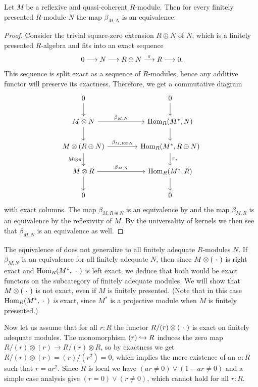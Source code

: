 \begin{corollary}
  \label{identification-hom-tensor-for-fp-modules}
  Let $M$ be a reflexive and quasi-coherent $R$-module.
  Then for every finitely presented $R$-module $N$ the map $\beta_{M,N}$
  is an equivalence.
\end{corollary}

\begin{proof}
  Consider the trivial square-zero extension $R \oplus N$ of $N$, which is a finitely presented $R$-algebra and fits into an exact sequence
  \[
    0 \longrightarrow N \longrightarrow R \oplus N \overset{\pi}{\longrightarrow} R \longrightarrow 0\rlap{.}
  \]
  This sequence is split exact as a sequence of $R$-modules, hence any additive functor will preserve its exactness.
  Therefore, we get a commutative diagram
  \[
  \begin{tikzcd}[column sep=1.5cm]
    0 \ar[d] & 0 \ar[d] \\
    M \otimes N \ar[d]\ar[r, "\beta_{M,N}"] & \Hom_R(M^\ast,N) \ar[d] \\
    M\otimes (R\oplus N) \ar[r,"\beta_{M,R \oplus N}"] \ar[d,"M \otimes \pi"'] & \operatorname{Hom}_R(M^\ast,R\oplus N) \ar[d,"\pi_\ast"] \\
    M \otimes R \ar[d]\ar[r,"\beta_{M,R}"] & \operatorname{Hom}_R(M^\ast,R) \ar[d] \\
    0 & 0
  \end{tikzcd}
\]
with exact columns.
The map $\beta_{M,R \oplus N}$ is an equivalence by  and the map $\beta_{M,R}$ is an equivalence by the reflexivity of $M$.
By the universality of kernels we then see that $\beta_{M,N}$ is an equivalence as well.
\end{proof}

\begin{remark}
  The equivalence of  does not generalize to all finitely adequate $R$-modules $N$.
  If $\beta_{M,N}$ is an equivalence for all finitely adequate $N$,
  then since $M \otimes (\ \cdot\ )$ is right exact and $\mathrm{Hom}_R(M^\ast,\ \cdot\ )$ is left exact,
  we deduce that both would be exact functors on the subcategory of finitely adequate modules.
  We will show that $M \otimes (\ \cdot\ )$ is not exact, even if $M$ is finitely presented.
  (Note that in this case $\mathrm{Hom}_R(M^\ast,\ \cdot\ )$ \emph{is} exact, since $M^\ast$ is a projective module
  when $M$ is finitely presented.)

  Now let us assume that for all $r:R$ the functor $R/(r)\otimes(\ \cdot\ )$ is exact on finitely adequate modules. The monomorphism $(r) \lhook\joinrel\to R$ induces the zero map $R/(r) \otimes (r) \to R/(r) \otimes R$, so by exactness we get $R/(r) \otimes (r) = (r)/(r^2) = 0$, which implies the mere existence of an $a:R$ such that $r=ar^2$. Since $R$ is local we have $(ar \neq 0) \lor (1-ar \neq 0)$ and a simple case analysis give $(r=0) \lor (r \neq 0)$, which cannot hold for all $r:R$.
\end{remark}

